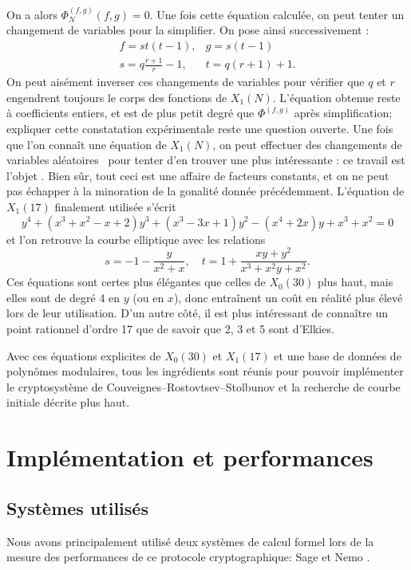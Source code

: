 \documentclass[11pt,a4paper]{article}
\renewcommand{\v}{\vspace{5mm}}
\theoremstyle{definition}
\begin{document}
On a alors $\Phi_N^{(f, g)}(f, g) = 0$. Une fois cette équation calculée, on peut tenter un changement de variables pour la simplifier. On pose ainsi successivement :
$$\begin{matrix} f = st(t-1), & g = s(t-1)\\
 s = q\frac{r+1}{r} - 1, & t = q(r+1) + 1.
 \end{matrix}$$
On peut aisément inverser ces changements de variables pour vérifier que $q$ et $r$ engendrent toujours le corps des fonctions de $X_1(N)$. L'équation obtenue reste à coefficients entiers, et est de plus petit degré que $\Phi^{(f, g)}$ après simplification; expliquer cette constatation expérimentale reste une question ouverte. Une fois que l'on connaît une équation de $X_1(N)$, on peut effectuer des changements de variables \og aléatoires \fg\ pour tenter d'en trouver une plus intéressante : ce travail est l'objet \cite{Sutheq}. Bien sûr, tout ceci est une affaire de facteurs constants, et on ne peut pas échapper à la minoration de la gonalité donnée précédemment. L'équation de $X_1(17)$ finalement utilisée s'écrit
$$y^4 + (x^3 + x^2 - x + 2)  y^3 + (x^3 - 3  x + 1)  y^2 - (x^4 + 2  x)  y + x^3 + x^2 = 0$$
et l'on retrouve la courbe elliptique avec les relations
$$s = -1 - \frac{y}{x^2 + x},\quad t = 1 + \frac{xy + y^2}{x^3 + x^2y + x^2}.$$
Ces équations sont certes plus élégantes que celles de $X_0(30)$ plus haut, mais elles sont de degré 4 en $y$ (ou en $x$), donc entraînent un coût en réalité plus élevé lors de leur utilisation. D'un autre côté, il est plus intéressant de connaître un point rationnel d'ordre 17 que de savoir que 2, 3 et 5 sont d'Elkies.

\v

Avec ces équations explicites de $X_0(30)$ et $X_1(17)$ et une base de données de polynômes modulaires, tous les ingrédients sont réunis pour pouvoir implémenter le cryptosystème de Couveignes--Rostovtsev--Stolbunov et la recherche de courbe initiale décrite plus haut.


\newpage

\section{Implémentation et performances}

\subsection{Systèmes utilisés}

Nous avons principalement utilisé deux systèmes de calcul formel lors de la mesure des performances de ce protocole cryptographique: Sage \cite{Sage} et Nemo \cite{Nemo}.
\end{document}
